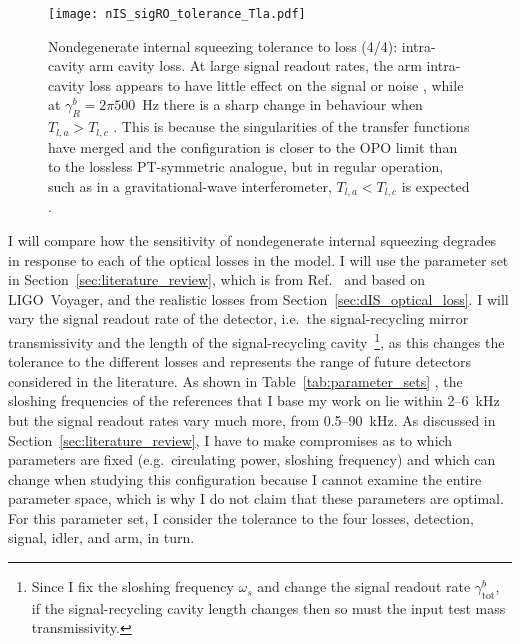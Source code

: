 \begin{figure}
    \centering
    \texttt{[image: nIS\_sigRO\_tolerance\_Tla.pdf]}
    \caption{ Nondegenerate internal squeezing tolerance to loss (4/4): intra-cavity arm cavity loss. At large signal readout rates, the arm intra-cavity loss appears to have little effect on the signal or noise , while at $\gamma^b_R=2\pi 500$~Hz there is a sharp change in behaviour when $T_{l,a}>T_{l,c}$ . This is because the singularities of the transfer functions have merged and the configuration is closer to the OPO limit than to the lossless PT-symmetric analogue, but in regular operation, such as in a gravitational-wave interferometer, $T_{l,a}<T_{l,c}$ is expected .}
    \label{fig:nIS_sigRO_tolerance_Tla}
\end{figure}


I will compare how the sensitivity of nondegenerate internal squeezing degrades in response to each of the optical losses in the model. I will use the parameter set in Section~\ref{sec:literature_review}, which is from Ref.~\cite{Li2020} and based on LIGO~Voyager, and the realistic losses from Section~\ref{sec:dIS_optical_loss}. I will vary the signal readout rate of the detector, i.e.\ the signal-recycling mirror transmissivity and the length of the signal-recycling cavity~\footnote{Since I fix the sloshing frequency $\omega_s$ and change the signal readout rate $\gamma^b_\text{tot}$, if the signal-recycling cavity length changes then so must the input test mass transmissivity.}, as this changes the tolerance to the different losses and represents the range of future detectors considered in the literature. As shown in Table~\ref{tab:parameter_sets} , the sloshing frequencies of the references that I base my work on lie within 2--6~kHz but the signal readout rates vary much more, from 0.5--90~kHz. As discussed in Section~\ref{sec:literature_review}, I have to make compromises as to which parameters are fixed (e.g.\ circulating power, sloshing frequency) and which can change when studying this configuration because I cannot examine the entire parameter space, which is why I do not claim that these parameters are optimal. For this parameter set, I consider the tolerance to the four losses, detection, signal, idler, and arm, in turn. 

